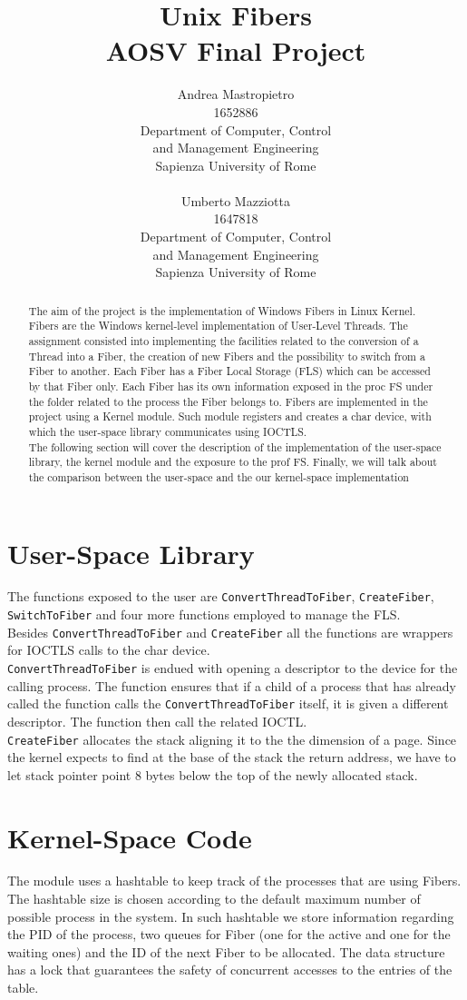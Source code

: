 \documentclass[11pt]{article}
\title{Unix Fibers\\AOSV Final Project}
\author{Andrea Mastropietro \\
    1652886\\
    Department of Computer, Control\\and Management Engineering\\
  Sapienza University of Rome \\
  \\\And
  Umberto Mazziotta \\
  1647818 \\
  Department of Computer, Control\\and Management Engineering\\
   Sapienza University of Rome \\}
\date{}
\begin{document}
\maketitle
\begin{abstract}
The aim of the project is the implementation of Windows Fibers in Linux Kernel. Fibers are the Windows kernel-level implementation of User-Level Threads. The assignment consisted into implementing the facilities related to the conversion of a Thread into a Fiber, the creation of new Fibers and the possibility to switch from a Fiber to another. Each Fiber has a Fiber Local Storage (FLS) which can be accessed by that Fiber only. Each Fiber has its own information exposed in the proc FS under the folder related to the process the Fiber belongs to. Fibers are implemented in the project using a Kernel module. Such module registers and creates a char device, with which the user-space library communicates using IOCTLS.\\
The following section will cover the description of the implementation of the user-space library, the kernel module and the exposure to the prof FS. Finally, we will talk about the comparison between the user-space and the our kernel-space implementation 
\end{abstract}

\section{User-Space Library}
The functions exposed to the user are \texttt{ConvertThreadToFiber}, \texttt{CreateFiber}, \texttt{SwitchToFiber} and four more functions employed to manage the FLS.\\
Besides \texttt{ConvertThreadToFiber} and \texttt{CreateFiber} all the functions are wrappers for IOCTLS calls to the char device.\\
\texttt{ConvertThreadToFiber} is endued with opening a descriptor to the device for the calling process. The function ensures that if a child of a process that has already called the function calls the \texttt{ConvertThreadToFiber} itself, it is given a different descriptor. The function then call the related IOCTL.\\
\texttt{CreateFiber} allocates the stack aligning it to the the dimension of a page. Since the kernel expects to find at the base of the stack the return address, we have to let stack pointer point 8 bytes below the top of the newly allocated stack.

\section{Kernel-Space Code} 
The module uses a hashtable to keep track of the processes that are using Fibers. The hashtable size is chosen according to the default maximum number of possible process in the system. In such hashtable we store information regarding the PID of the process, two queues for Fiber (one for the active and one for the waiting ones) and the ID of the next Fiber to be allocated. The data structure has a lock that guarantees the safety of concurrent accesses to the entries of the table.
\end{document}
